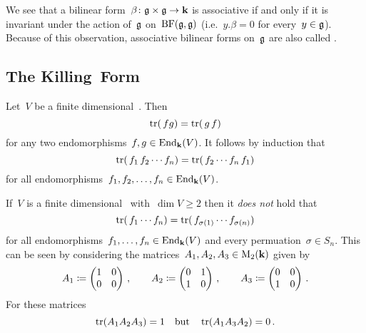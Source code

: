 \begin{remark}
  We see that a bilinear form~$\beta \colon \mathfrak{g} \times \mathfrak{g} \to \mathbf{k}$ is associative if and only if it is invariant under the action of~$\mathfrak{g}$ on~$\operatorname{BF}(\mathfrak{g}, \mathfrak{g})$ (i.e.~$y.\beta = 0$ for every~$y \in \mathfrak{g}$).
  Because of this observation, associative bilinear forms on~$\mathfrak{g}$ are also called .
\end{remark}





\subsection{The Killing~Form}




\begin{recall}
  \label{symmetric property of trace}
  Let~$V$ be a finite dimensional~{\vectorspace{$\kf$}}.
  Then
  \[
    \operatorname{tr}( \, f {} g)
    =
    \operatorname{tr}(\, g \, f)
  \]
  for any two endomorphisms~$f, g \in \operatorname{End}_{\mathbf{k}}(V)$.
  It follows by induction that
  \[
    \operatorname{tr}(\, f_1 \, f_2 \dotsm f_n)
    =
    \operatorname{tr}(\, f_2 \dotsm f_n \, f_1)
  \]
  for all endomorphisms~$f_1, f_2, \dotsc, f_n \in \operatorname{End}_{\mathbf{k}}(V)$.
\end{recall}


\begin{warning}
  If~$V$ is a finite dimensional~{\vectorspace{$\kf$}} with~$\dim V \geq 2$ then it \emph{does not} hold that
  \[
    \operatorname{tr}(\, f_1 \dotsm f_n)
    =
    \operatorname{tr}(\, f_{\sigma(1)} \dotsm f_{\sigma(n)})
  \]
  for all endomorphisms~$f_1, \dotsc, f_n \in \operatorname{End}_{\mathbf{k}}(V)$ and every permuation~$\sigma \in S_n$.
  This can be seen by considering the matrices~$A_1, A_2, A_3 \in \operatorname{M}_2(\mathbf{k})$ given by
  \[
    A_1
    \coloneqq
    \begin{pmatrix}
      1 & 0 \\
      0 & 0
    \end{pmatrix} \,,
    \qquad
    A_2
    \coloneqq
    \begin{pmatrix}
      0 & 1 \\
      1 & 0
    \end{pmatrix} \,,
    \qquad
    A_3
    \coloneqq
    \begin{pmatrix}
      0 & 0 \\
      1 & 0
    \end{pmatrix} \,.
  \]
  For these matrices
  \[
    \operatorname{tr}(A_1 A_2 A_3)
    =
    1
    \quad\text{but}\quad
    \operatorname{tr}(A_1 A_3 A_2)
    =
    0 \,.
  \]
\end{warning}


